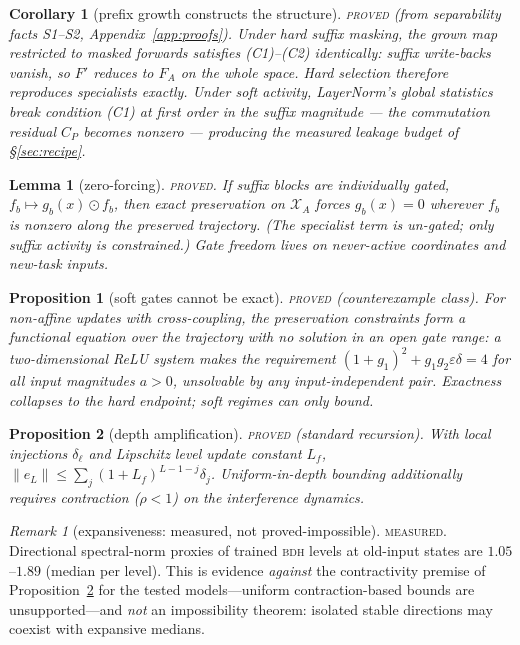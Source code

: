 \documentclass[11pt]{article}
\newtheorem{lemma}{Lemma}
\newtheorem{proposition}{Proposition}
\newtheorem{corollary}{Corollary}
\theoremstyle{definition}\newtheorem{definition}{Definition}
\theoremstyle{remark}\newtheorem{remark}{Remark}
\newcommand{\BDH}{\textsc{bdh}}
\begin{document}
\begin{corollary}[prefix growth constructs the structure]\label{cor:prefix}
\textsc{proved} (from separability facts S1--S2, Appendix~\ref{app:proofs}). Under hard
suffix masking, the grown map restricted to masked forwards satisfies (C1)--(C2)
identically: suffix write-backs vanish, so $F'$ reduces to $F_A$ on the whole space. Hard
selection therefore reproduces specialists exactly. Under \emph{soft} activity, LayerNorm's
global statistics break condition (C1) at first order in the suffix magnitude --- the
commutation residual $C_P$ becomes nonzero --- producing the measured leakage budget of
\S\ref{sec:recipe}.
\end{corollary}

\begin{lemma}[zero-forcing]\label{lem:zf}
\textsc{proved.} If suffix blocks are individually gated, $f_b\mapsto g_b(x)\odot f_b$, then
exact preservation on $\mathcal{X}_A$ forces $g_b(x)=0$ wherever $f_b$ is nonzero along the
preserved trajectory. (The specialist term is un-gated; only suffix activity is constrained.)
Gate freedom lives on never-active coordinates and new-task inputs.
\end{lemma}

\begin{proposition}[soft gates cannot be exact]\label{prop:soft}
\textsc{proved} (counterexample class). For non-affine updates with cross-coupling, the
preservation constraints form a functional equation over the trajectory with no solution in
an open gate range: a two-dimensional ReLU system makes the requirement
$(1{+}g_1)^2+g_1g_2\varepsilon\delta=4$ for all input magnitudes $a>0$, unsolvable by any
input-independent pair. Exactness collapses to the hard endpoint; soft regimes can only
bound.
\end{proposition}

\begin{proposition}[depth amplification]\label{prop:amp}
\textsc{proved} (standard recursion). With local injections $\delta_\ell$ and Lipschitz
level update constant $L_f$, $\|e_L\|\le\sum_j(1+L_f)^{L-1-j}\delta_j$. Uniform-in-depth
bounding additionally requires contraction ($\rho<1$) on the interference dynamics.
\end{proposition}

\begin{remark}[expansiveness: measured, not proved-impossible]\label{rem:exp}
\textsc{measured.} Directional spectral-norm proxies of trained \BDH{} levels at old-input
states are $1.05$--$1.89$ (median per level). This is evidence \emph{against} the
contractivity premise of Proposition~\ref{prop:amp} for the tested models---uniform
contraction-based bounds are unsupported---and \emph{not} an impossibility theorem: isolated
stable directions may coexist with expansive medians.
\end{remark}
\end{document}
